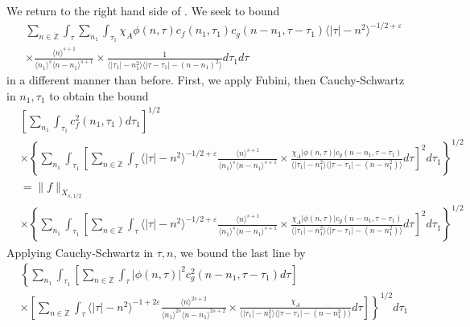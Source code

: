 \documentclass[12pt,reqno]{amsart}
\numberwithin{equation}{section}  %
\renewcommand{\cref}{\Cref}
\newcommand{\zz}{\mathbb{Z}}
\newcommand{\zzdot}{\dot{\zz}}
\newcommand{\ee}{\varepsilon}
\begin{document}
We return to the right hand side of \cref{pre-fubini-int-form}.
We seek to bound
\begin{equation*}
\begin{split}
& \sum_{n \in \zzdot} \int_{\tau}  \sum_{n_{1}}
\int_{\tau_{1}} \chi_{A} \phi(n, \tau)
c_f(n_1, \tau_1)
c_g(n - n_1, \tau - \tau_1 ) \langle | \tau | - n^{2} \rangle ^{-1/2+\ee}
\\
& \times \frac{\langle n \rangle ^{s+1}}{\langle n_{1} \rangle ^{s} \langle
n-n_{1} \rangle ^{s+1}} \times \frac{1}{\langle |\tau_{1}| - n_{1}^{2} \rangle
\langle |\tau - \tau_{1}|-(n - n_{1})^{2} \rangle } d \tau_1 d \tau 
\end{split}
\end{equation*}
in a different manner than before. First, we apply 
Fubini, then Cauchy-Schwartz in $n_{1}, \tau_{1}$ to obtain the bound
\begin{equation*}
\begin{split}
& \left[ \sum_{n_{1}} \int_{\tau_{1}} c_{f}^{2}(n_{1}, \tau_{1}) d \tau_{1}
\right]^{1/2}
\\
& \times \left \{\sum_{n_{1}} \int_{\tau_{1}}   
\left[
\sum_{n \in \zzdot} \int_{\tau} \langle | \tau | - n^{2} \rangle ^{-1/2+\ee}
\frac{\langle n \rangle ^{s+1}}{\langle n_{1} \rangle ^{s} \langle
n-n_{1} \rangle ^{s+1}} 
\times \frac{\chi_{A} |\phi(n, \tau)| c_{g}(n -
n_{1}, \tau - \tau_{1})
}{\langle | \tau_{1} | - n_{1}^{2} \rangle \langle | \tau -
\tau_{1} | - (n - n_{1}^{2}) \rangle} d \tau 
\right]^{2} d \tau_{1} \right \}^{1/2}
\\
& = \| f \|_{X_{s,1/2}}
\\
& \times \left \{\sum_{n_{1}} \int_{\tau_{1}}   
\left[
\sum_{n \in \zzdot} \int_{\tau} \langle | \tau | - n^{2} \rangle ^{-1/2+\ee}
\frac{\langle n \rangle ^{s+1}}{\langle n_{1} \rangle ^{s} \langle
n-n_{1} \rangle ^{s+1}} 
\times \frac{\chi_{A}|\phi(n, \tau)| c_{g}(n -
n_{1}, \tau - \tau_{1}) 
}{\langle | \tau_{1} | - n_{1}^{2} \rangle \langle | \tau -
\tau_{1} | - (n - n_{1}^{2}) \rangle} d \tau 
\right]^{2} d \tau_{1}  \right \}^{1/2}
\end{split}
\end{equation*}
Applying Cauchy-Schwartz in $\tau, n$, we bound the last line by 
\begin{equation*}
\begin{split}
& \left \{\sum_{n_{1}} \int_{\tau_{1}}   
\left [ \sum_{n \in \zzdot} \int_{\tau}
| \phi(n, \tau)|^{2} c_{g}^{2}(n - n_{1}, \tau - \tau_{1}) d \tau  
\right ] \right . 
\\
& \left. \times \left [ \sum_{n \in \zzdot} \int_{\tau} 
\langle | \tau | - n^{2} \rangle ^{-1 + 2\ee}
\frac{\langle n \rangle
^{2s+2}}{\langle n_{1} \rangle ^{2s} \langle n - n_{1}\rangle ^{2s+2}}
\times \frac{\chi_{A}}{\langle | \tau_{1} |
- n_{1}^{2} \rangle  \langle | \tau - \tau_{1} | - (n - n_{1}^{2})
\rangle} d \tau  \right ] \right \}^{1/2}d \tau_{1} 
\end{split}
\end{equation*}
\end{document}
